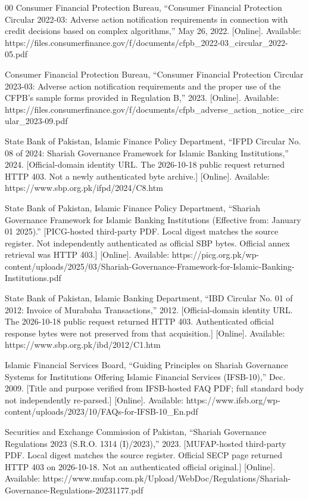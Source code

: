 \documentclass{ieeeaccess}
\begin{document}
\begin{thebibliography}{00}
 Consumer Financial Protection Bureau, ``Consumer Financial Protection Circular 2022-03: Adverse action notification requirements in connection with credit decisions based on complex algorithms,'' May 26, 2022. [Online]. Available: https://files.consumerfinance.gov/f/documents/\allowbreak cfpb\_2022-03\_circular\_2022-05.pdf

 Consumer Financial Protection Bureau, ``Consumer Financial Protection Circular 2023-03: Adverse action notification requirements and the proper use of the CFPB's sample forms provided in Regulation B,'' 2023. [Online]. Available: https://files.consumerfinance.gov/f/documents/\allowbreak cfpb\_adverse\_action\_notice\_circular\_2023-09.pdf

 State Bank of Pakistan, Islamic Finance Policy Department, ``IFPD Circular No. 08 of 2024: Shariah Governance Framework for Islamic Banking Institutions,'' 2024. [Official-domain identity URL. The 2026-10-18 public request returned HTTP 403. Not a newly authenticated byte archive.] [Online]. Available: https://www.sbp.org.pk/ifpd/2024/C8.htm

 State Bank of Pakistan, Islamic Finance Policy Department, ``Shariah Governance Framework for Islamic Banking Institutions (Effective from: January 01 2025).'' [PICG-hosted third-party PDF. Local digest matches the source register. Not independently authenticated as official SBP bytes. Official annex retrieval was HTTP 403.] [Online]. Available: https://picg.org.pk/wp-content/uploads/2025/03/Shariah-Governance-Framework-for-Islamic-Banking-Institutions.pdf

 State Bank of Pakistan, Islamic Banking Department, ``IBD Circular No. 01 of 2012: Invoice of Murabaha Transactions,'' 2012. [Official-domain identity URL. The 2026-10-18 public request returned HTTP 403. Authenticated official response bytes were not preserved from that acquisition.] [Online]. Available: https://www.sbp.org.pk/ibd/2012/C1.htm

 Islamic Financial Services Board, ``Guiding Principles on Shariah Governance Systems for Institutions Offering Islamic Financial Services (IFSB-10),'' Dec. 2009. [Title and purpose verified from IFSB-hosted FAQ PDF; full standard body not independently re-parsed.] [Online]. Available: https://www.ifsb.org/wp-content/uploads/2023/10/FAQs-for-IFSB-10\_En.pdf

 Securities and Exchange Commission of Pakistan, ``Shariah Governance Regulations 2023 (S.R.O. 1314 (I)/2023),'' 2023. [MUFAP-hosted third-party PDF. Local digest matches the source register. Official SECP page returned HTTP 403 on 2026-10-18. Not an authenticated official original.] [Online]. Available: https://www.mufap.com.pk/Upload/WebDoc/Regulations/Shariah-Governance-Regulations-20231177.pdf


\end{thebibliography}
\end{document}
